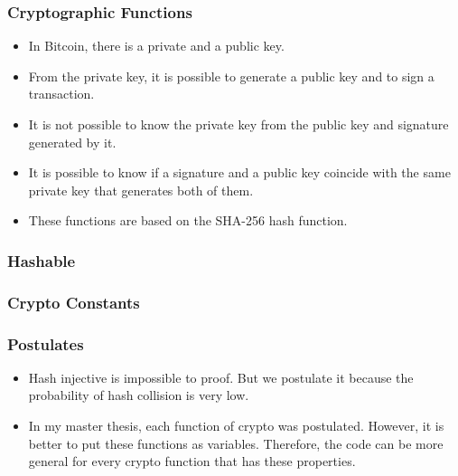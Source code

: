 \documentclass{beamer}
\begin{document}
\begin{frame}
  \frametitle{Cryptographic Functions}
  \begin{itemize}[<+->]
    \item In Bitcoin, there is a private and a public key.
    \item From the private key, it is possible to generate a public key
 and to sign a transaction.
    \item It is not possible to know the private key from the public key and signature generated by it.
    \item It is possible to know if a signature and a public key coincide with the same private key that generates both of them.
    \item These functions are based on the SHA-256 hash function.
  \end{itemize}
\end{frame}


\begin{frame}
  \frametitle{Hashable}


\end{frame}


\begin{frame}
  \frametitle{Crypto Constants}
\begin{code}

\end{code}
\end{frame}

\begin{frame}
  \frametitle{Postulates}
  \begin{itemize}[<+->]
    \item Hash injective is impossible to proof.
      But we postulate it because the probability of hash collision is very low.
    \item In my master thesis, each function of crypto was postulated.
      However, it is better to put these functions as variables.
      Therefore, the code can be more general for every crypto function that has these properties.
  \end{itemize}
\end{frame}
\end{document}
